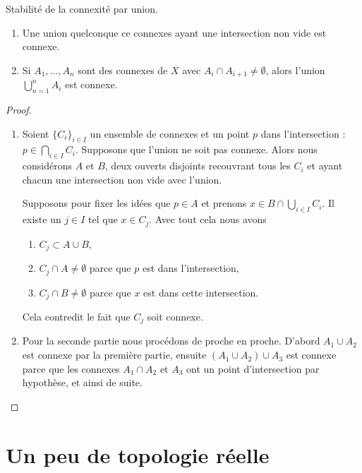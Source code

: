 \begin{proposition} \label{PropIWIDzzH}
    Stabilité de la connexité par union.
    \begin{enumerate}
        \item
    Une union quelconque ce connexes ayant une intersection non vide est connexe.
\item
    Si \( A_1,\ldots, A_n\) sont des connexes de \( X\) avec \( A_i\cap A_{i+1}\neq \emptyset\), alors l'union \( \bigcup_{n=1}^nA_i\) est connexe.
    \end{enumerate}
\end{proposition}

\begin{proof}
    \begin{enumerate}
        \item
    Soient \( \{ C_i \}_{i\in I}\) un ensemble de connexes et un point \( p\) dans l'intersection : \( p\in\bigcap_{i\in I}C_i\). Supposons que l'union ne soit pas connexe. Alors nous considérons \( A\) et \( B\), deux ouverts disjoints recouvrant tous les \( C_i\) et ayant chacun une intersection non vide avec l'union.

    Supposons pour fixer les idées que \( p\in A\) et prenons \( x\in B\cap\bigcup_{i\in I}C_i\). Il existe un \( j\in I\) tel que \( x\in C_j\). Avec tout cela nous avons
    \begin{enumerate}
        \item
            \( C_j\subset A\cup B\),
        \item
            \( C_j\cap A\neq \emptyset\) parce que \( p\) est dans l'intersection,
        \item
            \( C_j\cap B\neq\emptyset\) parce que \( x\) est dans cette intersection.
    \end{enumerate}
    Cela contredit le fait que \( C_j\) soit connexe.

\item

    Pour la seconde partie nous procédons de proche en proche. D'abord \( A_1\cup A_2\) est connexe par la première partie, ensuite \( (A_1\cup A_2)\cup A_3\) est connexe parce que les connexes \( A_1\cap A_2\) et \( A_3\) ont un point d'intersection par hypothèse, et ainsi de suite.
    \end{enumerate}
\end{proof}
\section{Un peu de topologie réelle}

